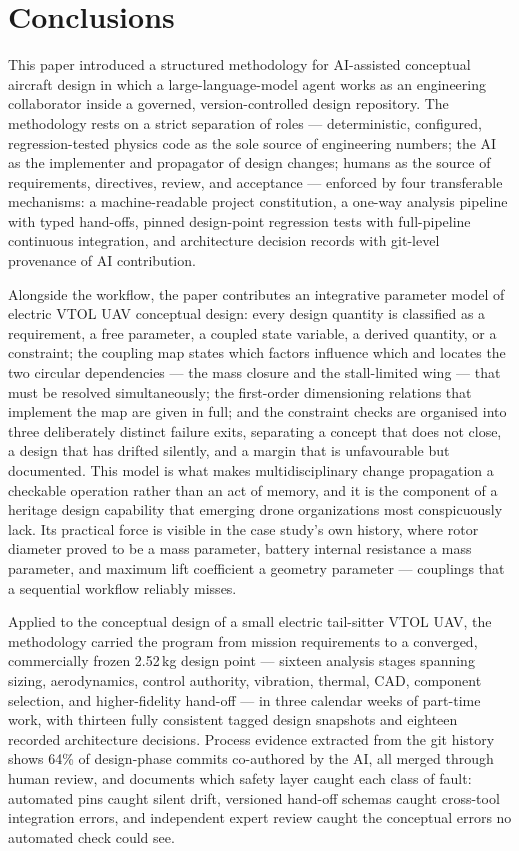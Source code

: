 \section{Conclusions}
\label{sec:conclusions}

This paper introduced a structured methodology for AI-assisted
conceptual aircraft design in which a large-language-model agent works
as an engineering collaborator inside a governed, version-controlled
design repository. The methodology rests on a strict separation of
roles --- deterministic, configured, regression-tested physics code as
the sole source of engineering numbers; the AI as the implementer and
propagator of design changes; humans as the source of requirements,
directives, review, and acceptance --- enforced by four transferable
mechanisms: a machine-readable project constitution, a one-way
analysis pipeline with typed hand-offs, pinned design-point regression
tests with full-pipeline continuous integration, and architecture
decision records with git-level provenance of AI contribution.

Alongside the workflow, the paper contributes an integrative parameter
model of electric VTOL UAV conceptual design: every design quantity is
classified as a requirement, a free parameter, a coupled state
variable, a derived quantity, or a constraint; the coupling map states
which factors influence which and locates the two circular
dependencies --- the mass closure and the stall-limited wing --- that
must be resolved simultaneously; the first-order dimensioning relations
that implement the map are given in full; and the constraint checks are
organised into three deliberately distinct failure exits, separating a
concept that does not close, a design that has drifted silently, and a
margin that is unfavourable but documented. This model is what makes
multidisciplinary change propagation a checkable operation rather than
an act of memory, and it is the component of a heritage design
capability that emerging drone organizations most conspicuously lack.
Its practical force is visible in the case study's own history, where
rotor diameter proved to be a mass parameter, battery internal
resistance a mass parameter, and maximum lift coefficient a geometry
parameter --- couplings that a sequential workflow reliably misses.

Applied to the conceptual design of a small electric tail-sitter VTOL
UAV, the methodology carried the program from mission requirements to
a converged, commercially frozen 2.52\,kg design point --- sixteen
analysis stages spanning sizing, aerodynamics, control authority,
vibration, thermal, CAD, component selection, and higher-fidelity
hand-off --- in three calendar weeks of part-time work, with thirteen
fully consistent tagged design snapshots and eighteen recorded
architecture decisions. Process evidence extracted from the git
history shows 64\% of design-phase commits co-authored by the AI, all
merged through human review, and documents which safety layer caught
each class of fault: automated pins caught silent drift, versioned
hand-off schemas caught cross-tool integration errors, and independent
expert review caught the conceptual errors no automated check could
see.

